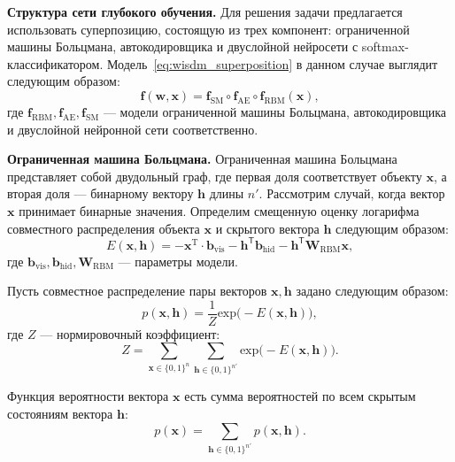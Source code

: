 \textbf{Структура сети глубокого обучения. }
Для решения задачи предлагается использовать суперпозицию, состоящую из трех компонент:
ограниченной машины Больцмана, автокодировщика и двуслойной нейросети с softmax-классификатором.
Модель~\eqref{eq:wisdm_superposition} в данном случае выглядит следующим образом:
\[
    \mathbf{f}(\mathbf{w}, \mathbf{x}) = \mathbf{f}_\text{SM} \circ \mathbf{f}_\text{AE} \circ  \mathbf{f}_\text{RBM}(\mathbf{x}),
\]
где $\mathbf{f}_\text{RBM}, \mathbf{f}_\text{AE}, \mathbf{f}_\text{SM}$ --- модели ограниченной машины Больцмана, автокодировщика и двуслойной нейронной сети соответственно.

\textbf{Ограниченная машина Больцмана.}
Ограниченная машина Больцмана представляет собой двудольный граф, где первая доля соответствует объекту $\mathbf{x}$, а вторая доля --- бинарному вектору $\mathbf{h}$ длины $n'$.
Рассмотрим случай, когда вектор $\mathbf{x}$ принимает бинарные значения. Определим смещенную оценку логарифма совместного распределения объекта $\mathbf{x}$ и скрытого вектора $\mathbf{h}$ следующим образом:
\begin{equation}
 E(\mathbf{x},\mathbf{h}) = -\mathbf{x}^\text{T} \cdot \mathbf{b}_\text{vis} -\mathbf{h}^\mathsf{T}  \mathbf{b}_\text{hid} - \mathbf{h}^\mathsf{T}\mathbf{W}_\text{RBM}\mathbf{x},
\label{eq:energy}
\end{equation}
где $\mathbf{b}_\text{vis}, \mathbf{b}_\text{hid}, \mathbf{W}_\text{RBM}$ --- параметры модели.

Пусть совместное распределение пары векторов $\mathbf{x}, \mathbf{h}$ задано следующим образом:
\[
	p(\mathbf{x}, \mathbf{h}) = \frac{1}{Z} \text{exp}\bigl(-E(\mathbf{x},\mathbf{h})\bigr),
\]
где $Z$ --- нормировочный коэффициент:
\[
 Z = \sum_{\mathbf{x} \in \{0,1\}^n} \sum_{\mathbf{h}\in \{0,1\}^{n'}} \text{exp}\bigl(-E(\mathbf{x},\mathbf{h})\bigr).
\]


Функция вероятности вектора $\mathbf{x}$ есть сумма вероятностей по всем скрытым состояниям вектора $\mathbf{h}$:
\[
	p(\mathbf{x}) = \sum_{\mathbf{h}\in \{0,1\}^{n'}} p(\mathbf{x}, \mathbf{h}).
\]


